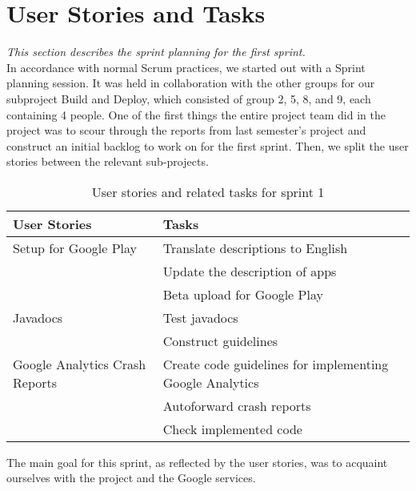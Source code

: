 \section{User Stories and Tasks} \label{Sprint1_SecUserStoriesAndTasks}
\textit{This section describes the sprint planning for the first sprint.}\\
In accordance with normal Scrum practices, we started out with a Sprint planning session. It was held in collaboration with the other groups for our subproject Build and Deploy, which consisted of group 2, 5, 8, and 9, each containing 4 people. One of the first things the entire project team did in the project was to scour through the reports from last semester's project and construct an initial backlog to work on for the first sprint. Then, we split the user stories between the relevant sub-projects.

\begin{table}[H]
	\centering
	\begin{tabular}{ll}
		\textbf{User Stories} & \textbf{Tasks}\\ \hline \noalign{\vskip 2mm}
		Setup for Google Play & Translate descriptions to English\\
		& Update the description of apps\\
		& Beta upload for Google Play\\ \hline
		Javadocs & Test javadocs\\
		& Construct guidelines\\ \hline
		Google Analytics Crash Reports & Create code guidelines for implementing Google Analytics\\
		& Autoforward crash reports\\
		& Check implemented code\\ \hline
	\end{tabular}
	\caption{User stories and related tasks for sprint 1}
	\label{UserStories_table}
\end{table}

The main goal for this sprint, as reflected by the user stories, was to acquaint ourselves with the project and the Google services.\\